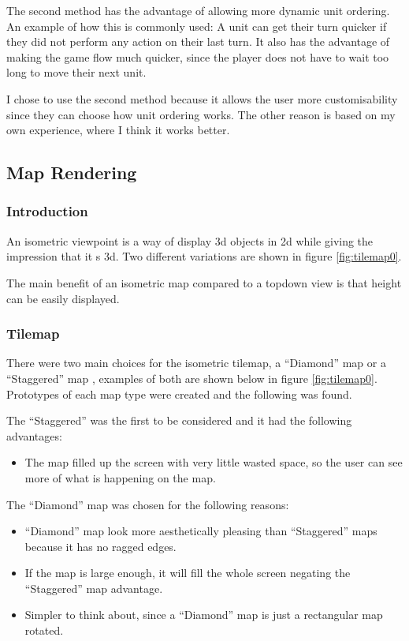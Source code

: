 The second method has the advantage of allowing more dynamic unit ordering.  An example of how this is commonly used: A unit can get their turn quicker if they did not perform any action on their last turn. It also has the advantage of making the game flow much quicker, since the player does not have to wait too long to move their next unit. 

I chose to use the second method because it allows the user more customisability since they can choose how unit ordering works. The other reason is based on my own experience, where I think it works better.

\subsection{Map Rendering}

\subsubsection{Introduction}
An isometric viewpoint is a way of display 3d objects in 2d while giving the impression that it s 3d.  Two different variations are shown in figure \ref{fig:tilemap0}.  

The main benefit of an isometric map compared to a topdown view is that height can be easily displayed. 

\subsubsection{Tilemap}
\label{sub:tilemap}

There were two main choices for the isometric tilemap, a ``Diamond'' map or a  ``Staggered'' map \cite{isometric_game_programming}, examples of both are shown below in figure \ref{fig:tilemap0}. Prototypes of each map type were created and the following was found.  

The ``Staggered'' was the first to be considered and it had the following advantages:
\begin{itemize}
	\item The map filled up the screen with very little wasted space, so the user can see more of what is happening on the map. 
\end{itemize}

The ``Diamond'' map was chosen for the following reasons:
\begin{itemize}
	\item ``Diamond'' map look more aesthetically pleasing than ``Staggered'' maps because it has no ragged edges.
	\item  If the map is large enough, it will fill the whole screen negating the ``Staggered'' map advantage.
	\item  Simpler to think about, since a ``Diamond'' map is just a rectangular map rotated.
\end{itemize}


